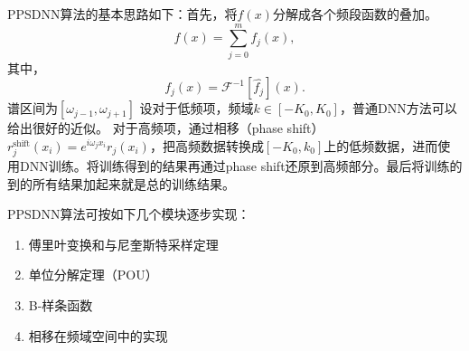 PPSDNN算法的基本思路如下：首先，将$f(x)$分解成各个频段函数的叠加。
\begin{equation}
f(x)=%
{\displaystyle\sum\limits_{j=0}^{m}}
f_{j}(x), \label{x-decomp}%
\end{equation}
其中，
\[
f_{j}(x)=\mathcal{F}^{-1}[\widehat{f_{j}}](x).
\]
谱区间为$[\omega _{j-1},\omega _{j+1}]$
设对于低频项，频域$k\in [-K_0,K_0]$，普通DNN方法可以给出很好的近似。
对于高频项，通过相移（phase shift）$r_{j}^{\text{shift}}(x_{i})=e^{i\omega_{j}x_{i}}r_{j}(x_{i})$，把高频数据转换成$[-K_0,k_0]$上的低频数据，进而使用DNN训练。将训练得到的结果再通过phase shift还原到高频部分。最后将训练的到的所有结果加起来就是总的训练结果。

PPSDNN算法可按如下几个模块逐步实现：
\begin{enumerate}
    \item 傅里叶变换和与尼奎斯特采样定理\cite{vaidyanathan2001generalizations}
    \item 单位分解定理（POU）
    \item B-样条函数
    \item 相移在频域空间中的实现
\end{enumerate}
